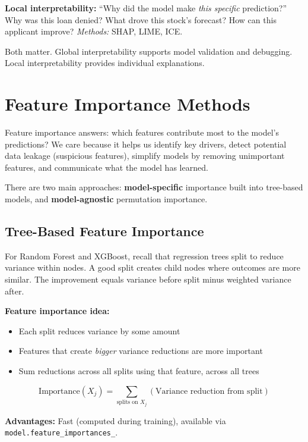 \documentclass[11pt,a4paper]{article}
\newcommand{\keyword}[1]{\textbf{\textcolor{AccentOrange}{#1}}}
\begin{document}
\textbf{Local interpretability:} ``Why did the model make \emph{this specific} prediction?'' Why was this loan denied? What drove this stock's forecast? How can this applicant improve? \emph{Methods:} SHAP, LIME, ICE.

Both matter. Global interpretability supports model validation and debugging. Local interpretability provides individual explanations.

\section{Feature Importance Methods}

Feature importance answers: which features contribute most to the model's predictions? We care because it helps us identify key drivers, detect potential data leakage (suspicious features), simplify models by removing unimportant features, and communicate what the model has learned.

There are two main approaches: \keyword{model-specific} importance built into tree-based models, and \keyword{model-agnostic} permutation importance.

\subsection{Tree-Based Feature Importance}

For Random Forest and XGBoost, recall that regression trees split to reduce variance within nodes. A good split creates child nodes where outcomes are more similar. The improvement equals variance before split minus weighted variance after.

\textbf{Feature importance idea:}
\begin{itemize}
    \item Each split reduces variance by some amount
    \item Features that create \emph{bigger} variance reductions are more important
    \item Sum reductions across all splits using that feature, across all trees
\end{itemize}
\[
\text{Importance}(X_j) = \sum_{\text{splits on } X_j} (\text{Variance reduction from split})
\]

\textbf{Advantages:} Fast (computed during training), available via \texttt{model.feature\_importances\_}.
\end{document}

